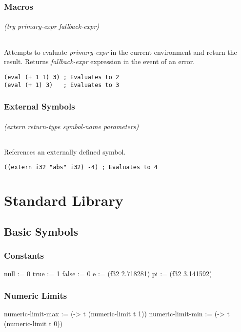 \documentclass[twoside=false, numbers=noenddot]{scrbook}
\newenvironment{likely}
{ \verbatim }
{ \endverbatim }
\begin{document}
\section{Macros}
\paragraph{(try \emph{primary-expr} \emph{fallback-expr})}
Attempts to evaluate \emph{primary-expr} in the current environment and return the result.
Returns \emph{fallback-expr} expression in the event of an error.

\begin{verbatim}
(eval (+ 1 1) 3) ; Evaluates to 2
(eval (+ 1) 3)   ; Evaluates to 3
\end{verbatim}

\section{External Symbols}
\paragraph{(extern \emph{return-type} \emph{symbol-name} \emph{parameters})}
References an externally defined symbol.

\begin{verbatim}
((extern i32 "abs" i32) -4) ; Evaluates to 4
\end{verbatim}

\part{Standard Library}
\chapter{Basic Symbols}
\section{Constants}
\begin{likely}
null  := 0
true  := 1
false := 0
e  := (f32 2.718281)
pi := (f32 3.141592)
\end{likely}

\section{Numeric Limits}
\begin{likely}
numeric-limit-max := (-> t (numeric-limit t 1))
numeric-limit-min := (-> t (numeric-limit t 0))
\end{likely}
\end{document}
